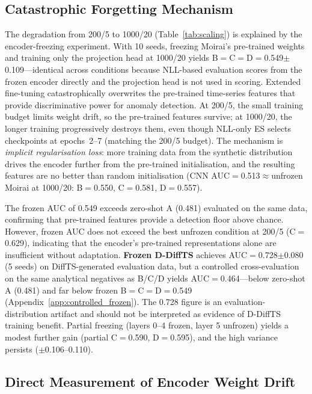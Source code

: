 \subsection{Catastrophic Forgetting Mechanism}
\label{app:forgetting_mechanism}

The degradation from 200/5 to 1000/20
(Table~\ref{tab:scaling}) is explained by the encoder-freezing experiment.
With 10 seeds, freezing Moirai's pre-trained weights and training only
the projection head at 1000/20 yields B$=$C$=$D$=$0.549$\pm$0.109---identical
across conditions because NLL-based evaluation scores from the frozen
encoder directly and the projection head is not used in scoring.
Extended fine-tuning catastrophically overwrites the pre-trained
time-series features that provide discriminative power for anomaly detection.
At 200/5, the small training budget limits weight drift, so the
pre-trained features survive; at 1000/20, the longer training
progressively destroys them, even though NLL-only ES selects checkpoints
at epochs~2--7 (matching the 200/5 budget).
The mechanism is \emph{implicit regularisation loss}: more training data
from the synthetic distribution drives the encoder further from the
pre-trained initialisation, and the resulting features are no better
than random initialisation (CNN AUC$=$0.513$\approx$unfrozen Moirai
at 1000/20: B$=$0.550, C$=$0.581, D$=$0.557).

The frozen AUC of 0.549 exceeds zero-shot A (0.481) evaluated on the
same data, confirming that pre-trained features provide a detection
floor above chance.  However, frozen AUC does not exceed the best
unfrozen condition at 200/5 (C$=$0.629), indicating that the encoder's
pre-trained representations alone are insufficient without adaptation.
\textbf{Frozen D-DiffTS} achieves AUC$=$0.728$\pm$0.080 (5 seeds) on
DiffTS-generated evaluation data, but a controlled cross-evaluation on
the same analytical negatives as B/C/D yields AUC$=$0.464---below zero-shot
A (0.481) and far below frozen B$=$C$=$D$=$0.549 (Appendix~\ref{app:controlled_frozen}).
The 0.728 figure is an evaluation-distribution artifact and should not be
interpreted as evidence of D-DiffTS training benefit.
Partial freezing (layers 0--4 frozen, layer 5 unfrozen) yields a modest
further gain (partial C$=$0.590, D$=$0.595),
and the high variance persists ($\pm$0.106--0.110).

\subsection{Direct Measurement of Encoder Weight Drift}
\label{app:weight_drift}

